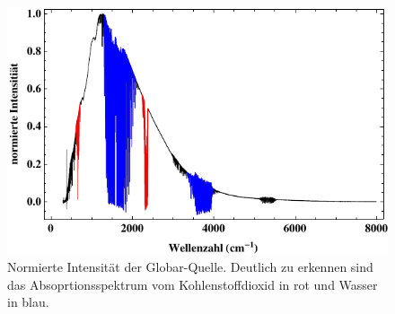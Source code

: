\documentclass[paper=a4,fontsize=10pt,DIV=18,twocolumn,parskip=half]{scrartcl}
\numberwithin{equation}{section}    %
\begin{document}
\begin{figure}[htp]
	\begin{center}
		\includegraphics[width=\columnwidth]{Bilder/Luft1}
		\caption{Normierte Intensität der Globar-Quelle. Deutlich zu erkennen sind das Absoprtionsspektrum vom Kohlenstoffdioxid in rot und Wasser in blau. }
		\label{Luft1}
	\end{center}
\end{figure}
\end{document}

